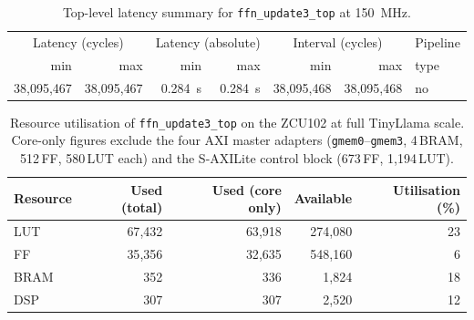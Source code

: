 \begin{table}[H]
  \centering
  \begin{tabular}{rrrrrrl}
    \toprule
    \multicolumn{2}{c}{Latency (cycles)} &
    \multicolumn{2}{c}{Latency (absolute)} &
    \multicolumn{2}{c}{Interval (cycles)} & Pipeline \\
    min & max & min & max & min & max & type \\
    \midrule
    38{,}095{,}467 & 38{,}095{,}467 &
    \SI{0.284}{\second} & \SI{0.284}{\second} &
    38{,}095{,}468 & 38{,}095{,}468 & no \\
    \bottomrule
  \end{tabular}
  \caption{Top-level latency summary for \texttt{ffn\_update3\_top}
           at \SI{150}{\mega\hertz}.}
  \label{tab:ffn_u3_top_latency}
\end{table}

\begin{table}[H]
  \centering
  \begin{tabular}{lrrrr}
    \toprule
    Resource & Used (total) & Used (core only) & Available & Utilisation (\%) \\
    \midrule
    LUT  & 67{,}432 & 63{,}918 & 274{,}080 & 23 \\
    FF   & 35{,}356 & 32{,}635 & 548{,}160 &  6 \\
    BRAM &      352 &      336 &   1{,}824 & 18 \\
    DSP  &      307 &      307 &   2{,}520 & 12 \\
    \bottomrule
  \end{tabular}
  \caption{Resource utilisation of \texttt{ffn\_update3\_top} on the
           ZCU102 at full TinyLlama
           scale. Core-only figures exclude the four AXI master adapters
           (\texttt{gmem0}--\texttt{gmem3}, 4\,BRAM, 512\,FF, 580\,LUT
           each) and the S-AXILite control block (673\,FF, 1{,}194\,LUT).}
  \label{tab:ffn_u3_resources}
\end{table}

